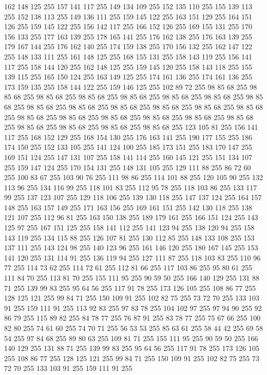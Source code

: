 162 148 125 255 157 141 117 255 149 134 109 255 152 135 110 255 155 139 113 255 152 138 113 255 149 136 111 255 159 145 122 255 163 151 129 255 164 151 126 255 159 145 122 255 156 142 117 255 166 152 126 255 169 155 131 255 170 156 133 255 177 163 139 255 178 165 141 255 176 162 138 255 176 163 139 255 179 167 144 255 176 162 140 255 174 159 138 255 170 156 132 255 162 147 122 255 148 133 111 255 161 148 125 255 168 155 131 255 158 143 119 255 156 141 117 255 158 144 120 255 162 148 125 255 159 145 120 255 158 143 118 255 155 139 115 255 165 150 124 255 163 149 125 255 174 161 136 255 174 161 136 255 173 159 135 255 158 144 122 255 159 146 125 255 102 89 72 255 98 85 68 255 98 85 68 255 98 85 68 255 98 85 68 255 98 85 68 255 98 85 68 255 98 85 68 255 98 85 68 255 98 85 68 255 98 85 68 255 98 85 68 255 98 85 68 255 98 85 68 255 98 85 68 255 98 85 68 255 98 85 68 255 98 85 68 255 98 85 68 255 98 85 68 255 98 85 68 255 98 85 68 255 98 85 68 255
98 85 68 255 98 85 68 255 123 105 81 255 156 141 117 255 168 152 129 255 168 154 130 255 176 163 141 255 190 177 155 255 186 174 150 255 152 133 105 255 141 124 100 255 185 173 151 255 183 170 147 255 169 151 124 255 147 131 107 255 158 141 114 255 160 145 121 255 151 134 107 255 159 147 124 255 170 154 131 255 148 131 105 255 129 111 88 255 86 72 60 255 100 83 67 255 103 90 76 255 111 98 86 255 114 101 88 255 120 105 90 255 132 113 96 255 134 116 99 255 118 101 83 255 112 95 78 255 118 103 86 255 133 117 99 255 137 123 107 255 129 118 106 255 139 130 118 255 147 137 124 255 164 157 148 255 163 157 149 255 171 163 156 255 169 161 151 255 142 130 118 255 138 121 107 255 112 96 81 255 163 150 138 255 189 179 161 255 166 151 124 255 143 125 97 255 167 151 125 255 158 141 112 255 141 123 94 255 138 120 94 255 158 143 119 255 134 115 88 255 126 107 81 255 130 112 85 255 148 133 108 255 153 137 111 255 143 124 98 255 140 123 96 255 161 146 120 255 180 167 145 255 153 141 120 255
131 114 91 255 136 119 94 255 127 111 87 255 118 103 83 255 110 96 77 255 114 73 62 255 114 72 61 255 112 81 66 255 117 103 86 255 95 80 61 255 111 84 70 255 113 81 70 255 155 111 95 255 90 59 50 255 166 140 129 255 131 88 71 255 139 99 83 255 95 64 56 255 117 91 78 255 173 126 105 255 108 86 77 255 128 125 121 255 99 84 71 255 150 109 91 255 102 82 75 255 73 72 70 255 133 103 91 255 159 111 91 255 113 92 83 255 97 83 78 255 104 102 97 255 97 94 90 255 92 86 79 255 115 89 82 255 84 78 77 255 76 87 91 255 83 78 77 255 75 67 66 255 100 82 80 255 74 61 60 255 74 70 71 255 56 53 53 255 85 63 61 255 58 44 42 255 69 58 54 255 97 84 68 255 89 80 63 255 109 81 71 255 155 111 95 255 90 59 50 255 166 140 129 255 131 88 71 255 139 99 83 255 95 64 56 255 117 91 78 255 173 126 105 255 108 86 77 255 128 125 121 255 99 84 71 255 150 109 91 255 102 82 75 255 73 72 70 255 133 103 91 255 159 111 91 255
